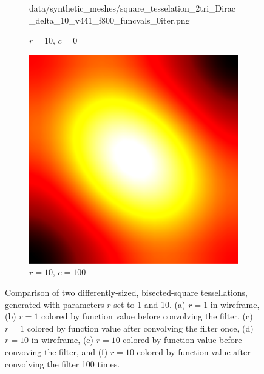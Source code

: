 \begin{figure}[ht]
\begin{subfigure}[b]{0.32\linewidth}
		{data/synthetic_meshes/square_tesselation_2tri_Dirac_delta_10_v441_f800_funcvals_0iter.png}
		\caption{$r=10$, $c=0$}\label{fig:sq2.e}
	\end{subfigure}
	\begin{subfigure}[b]{0.32\linewidth}
		\includegraphics[width=\linewidth]
		{data/synthetic_meshes/square_tesselation_2tri_Dirac_delta_10_v441_f800_funcvals_100iter.png}
		\caption{$r=10$, $c=100$}\label{fig:sq2.f}
	\end{subfigure}
	\caption[Six Views Comparing Bisected-Square Tessellations]{Comparison of two differently-sized, bisected-square tessellations, generated with parameters $r$ set to 1 and 10. (a) $r=1$ in wireframe, (b) $r=1$ colored by function value before convolving the filter, (c) $r=1$ colored by function value after convolving the filter once, (d) $r=10$ in wireframe, (e) $r=10$ colored by function value before convoving the filter, and (f) $r=10$ colored by function value after convolving the filter 100 times.}
	\label{fig:sq2}
\end{figure}
